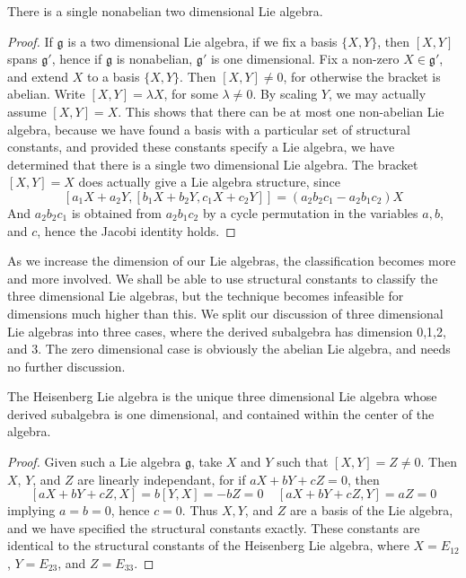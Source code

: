 \begin{theorem}
    There is a single nonabelian two dimensional Lie algebra.
\end{theorem}
\begin{proof}
    If $\mathfrak{g}$ is a two dimensional Lie algebra, if we fix a basis $\{ X,Y \}$, then $[X,Y]$ spans $\mathfrak{g}'$, hence if $\mathfrak{g}$ is nonabelian, $\mathfrak{g}'$ is one dimensional. Fix a non-zero $X \in \mathfrak{g}'$, and extend $X$ to a basis $\{ X, Y \}$. Then $[X,Y] \neq 0$, for otherwise the bracket is abelian. Write $[X,Y] = \lambda X$, for some $\lambda \neq 0$. By scaling $Y$, we may actually assume $[X,Y] = X$. This shows that there can be at most one non-abelian Lie algebra, because we have found a basis with a particular set of structural constants, and provided these constants specify a Lie algebra, we have determined that there is a single two dimensional Lie algebra. The bracket $[X,Y] = X$ does actually give a Lie algebra structure, since
    \[ [a_1X + a_2Y, [b_1X + b_2Y, c_1X + c_2Y]] = (a_2b_2c_1 - a_2b_1c_2) X \]
    And $a_2b_2c_1$ is obtained from $a_2b_1c_2$ by a cycle permutation in the variables $a,b$, and $c$, hence the Jacobi identity holds.
\end{proof}

As we increase the dimension of our Lie algebras, the classification becomes more and more involved. We shall be able to use structural constants to classify the three dimensional Lie algebras, but the technique becomes infeasible for dimensions much higher than this. We split our discussion of three dimensional Lie algebras into three cases, where the derived subalgebra has dimension 0,1,2, and 3. The zero dimensional case is obviously the abelian Lie algebra, and needs no further discussion.

\begin{theorem}
    The Heisenberg Lie algebra is the unique three dimensional Lie algebra whose derived subalgebra is one dimensional, and contained within the center of the algebra.
\end{theorem}
\begin{proof}
    Given such a Lie algebra $\mathfrak{g}$, take $X$ and $Y$ such that $[X,Y] = Z \neq 0$. Then $X$, $Y$, and $Z$ are linearly independant, for if $aX + bY + cZ = 0$, then
    \[ [aX + bY + cZ, X] = b[Y,X] = -bZ = 0\ \ \ \ \ [aX + bY + cZ, Y] = aZ = 0 \]
    implying $a = b = 0$, hence $c = 0$. Thus $X,Y$, and $Z$ are a basis of the Lie algebra, and we have specified the structural constants exactly. These constants are identical to the structural constants of the Heisenberg Lie algebra, where $X = E_{12}$, $Y = E_{23}$, and $Z = E_{33}$.
\end{proof}

